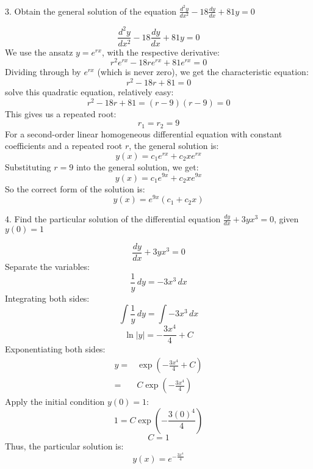 \documentclass[a4paper, 12pt]{report}
\def\ni{green!60!black!40!white}
\begin{document}
    
    
    \newpage
    
    \begin{tcolorbox}[title={\color{black}\section{Q3}}, colback=white, colframe=\ni, boxrule=1mm, width=1\textwidth]
        3. Obtain the general solution of the equation \( \frac{d^2 y}{dx^2} - 18 \frac{dy}{dx} + 81y = 0 \) 
    \end{tcolorbox}
    
    

    \[ \frac{d^2 y}{dx^2} - 18 \frac{dy}{dx} + 81y = 0 \]    
    We use the ansatz \( y = e^{rx} \), with the respective derivative:
    \[r^2 e^{rx} - 18r e^{rx} + 81 e^{rx} = 0\]
    Dividing through by \( e^{rx} \) (which is never zero), we get the characteristic equation:
    \[ r^2 - 18r + 81 = 0 \]
    solve this quadratic equation, relatively easy:
    \[ r^2 - 18r + 81 = (r - 9)(r - 9) = 0 \]
    This gives us a repeated root:
    \[ r_1 = r_2 = 9 \]
    For a second-order linear homogeneous differential equation with constant coefficients and a repeated root \( r \), the general solution is:
    \[ y(x) = c_1 e^{rx} + c_2 x e^{rx} \]
    Substituting \( r = 9 \) into the general solution, we get:
    \[ y(x) = c_1 e^{9x} + c_2 x e^{9x} \]
    So the correct form of the solution is:
    \[ \boxed{y(x) = e^{9x} (c_1 + c_2 x)} \]    
    \newpage
    
    \begin{tcolorbox}[title={\color{black}\section{Q4}}, colback=white, colframe=\ni, boxrule=1mm, width=1\textwidth]
        4. Find the particular solution of the differential equation \( \frac{dy}{dx} + 3y x^3 = 0 \), given \( y(0) = 1 \)
    \end{tcolorbox}
    
    \[\frac{dy}{dx} + 3y x^3 = 0\]
    Separate the variables:
    \[\frac{1}{y} \, dy = -3x^3 \, dx\]
    Integrating both sides:
    \[\int \frac{1}{y} \, dy = \int -3x^3 \, dx\]
    \[\ln|y| = -\frac{3x^4}{4} + C\]
    Exponentiating both sides:
    \begin{align*}
        y=&\exp\left(-\frac{3x^4}{4} + C\right)\\
            =&C \exp\left(-\frac{3x^4}{4}\right)
    \end{align*}
    Apply the initial condition \( y(0) = 1 \):
    \[1 = C \exp\left(-\frac{3(0)^4}{4}\right)\]
    \[C = 1\]
    Thus, the particular solution is:
    \[\boxed{y(x) = e^{-\frac{3x^4}{4}}}\]
        
\end{document}
